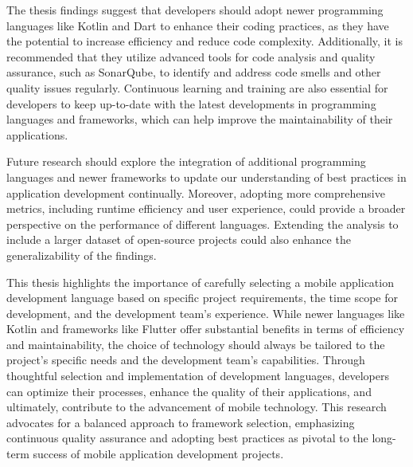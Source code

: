 \par
The thesis findings suggest that developers should adopt newer programming languages like Kotlin and Dart to enhance their coding practices, as they have the potential to increase efficiency and reduce code complexity. Additionally, it is recommended that they utilize advanced tools for code analysis and quality assurance, such as SonarQube, to identify and address code smells and other quality issues regularly. Continuous learning and training are also essential for developers to keep up-to-date with the latest developments in programming languages and frameworks, which can help improve the maintainability of their applications.
\par
Future research should explore the integration of additional programming languages and newer frameworks to update our understanding of best practices in application development continually. Moreover, adopting more comprehensive metrics, including runtime efficiency and user experience, could provide a broader perspective on the performance of different languages. Extending the analysis to include a larger dataset of open-source projects could also enhance the generalizability of the findings.
\par
This thesis highlights the importance of carefully selecting a mobile application development language based on specific project requirements, the time scope for development, and the development team’s experience. While newer languages like Kotlin and frameworks like Flutter offer substantial benefits in terms of efficiency and maintainability, the choice of technology should always be tailored to the project's specific needs and the development team's capabilities. Through thoughtful selection and implementation of development languages, developers can optimize their processes, enhance the quality of their applications, and ultimately, contribute to the advancement of mobile technology. This research advocates for a balanced approach to framework selection, emphasizing continuous quality assurance and adopting best practices as pivotal to the long-term success of mobile application development projects.
